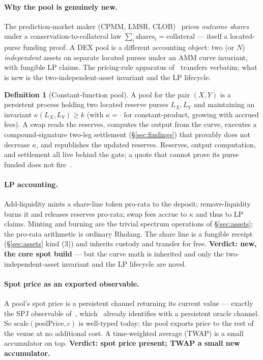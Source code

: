 \documentclass[11pt]{article}
\theoremstyle{definition}
\newtheorem{definition}{Definition}
\begin{document}
\paragraph{Why the pool is genuinely new.}
The prediction-market maker (CPMM, LMSR, CLOB)~\cite[\S6]{predmkt} prices \emph{outcome shares}
under a conservation-to-collateral law $\sum_i \text{shares}_i = \text{collateral}$ --- itself a
located-purse funding proof. A DEX pool is a different accounting object: two (or $N$) \emph{independent}
assets on separate located purses under an AMM curve invariant, with fungible LP claims. The
pricing-rule apparatus of~\cite[\S6.1]{predmkt} transfers verbatim; what is new is the
two-independent-asset invariant and the LP lifecycle.

\begin{definition}[Constant-function pool]\label{def:pool}
A pool for the pair $(X,Y)$ is a persistent process holding two located reserve purses
$L_X, L_Y$ and maintaining an invariant $\kappa(L_X, L_Y) \ge k$ (with $\kappa = {\cdot}$ for
constant-product, growing with accrued fees). A swap reads the reserves, computes the output from the
curve, executes a compound-signature two-leg settlement (\S\ref{sec:findings}) that provably does not
decrease $\kappa$, and republishes the updated reserves. Reserves, output computation, and settlement
all live behind the gate; a quote that cannot prove its purse funded does not fire~\cite[\S6.4]{predmkt}.
\end{definition}

\paragraph{LP accounting.}
Add-liquidity mints a share-line token pro-rata to the deposit; remove-liquidity burns it and
releases reserves pro-rata; swap fees accrue to $\kappa$ and thus to LP claims. Minting and burning
are the trivial spectrum operations of \S\ref{sec:assets}; the pro-rata arithmetic is ordinary
Rholang. The share line is a fungible receipt (\S\ref{sec:assets} kind (3)) and inherits custody and
transfer for free. \textbf{Verdict: new, the core spot build} --- but the curve math is inherited and
only the two-independent-asset invariant and the LP lifecycle are novel.

\paragraph{Spot price as an exported observable.}
A pool's spot price is a persistent channel returning its current value --- exactly the SPJ observable
of~\cite[\S2.2]{finrho}, which~\cite[\S4.1]{predmkt} already identifies with a persistent oracle
channel. So $\mathrm{scale}(\text{poolPrice}, c)$ is well-typed today; the pool exports price to the
rest of the venue at no additional cost. A time-weighted average (TWAP) is a small accumulator on top.
\textbf{Verdict: spot price present; TWAP a small new accumulator.}
\end{document}
